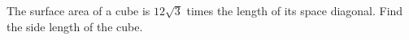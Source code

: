The surface area of a cube is $12\sqrt3$ times the length of its space diagonal. Find the side length of the cube.
